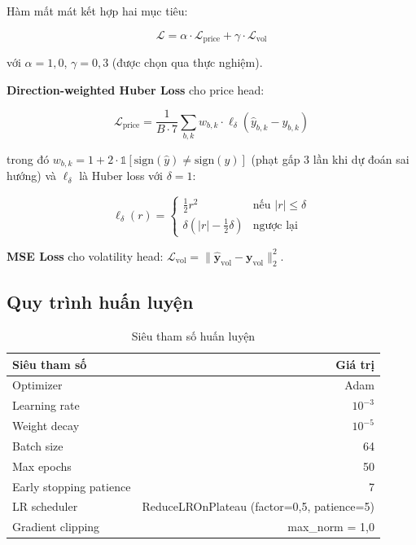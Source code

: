 \documentclass[12pt, a4paper]{report}
\begin{document}
Hàm mất mát kết hợp hai mục tiêu:

\begin{equation}
  \mathcal{L} = \alpha \cdot \mathcal{L}_{\text{price}} + \gamma \cdot \mathcal{L}_{\text{vol}}
\end{equation}

với $\alpha = 1{,}0$, $\gamma = 0{,}3$ (được chọn qua thực nghiệm).

\textbf{Direction-weighted Huber Loss} cho price head:

\begin{equation}
  \mathcal{L}_{\text{price}} = \frac{1}{B \cdot 7} \sum_{b,k}
  w_{b,k} \cdot \ell_\delta(\hat{y}_{b,k} - y_{b,k})
\end{equation}

trong đó $w_{b,k} = 1 + 2 \cdot \mathbb{1}[\text{sign}(\hat{y}) \neq \text{sign}(y)]$
(phạt gấp 3 lần khi dự đoán sai hướng) và $\ell_\delta$ là Huber loss với $\delta = 1$:

\begin{equation}
  \ell_\delta(r) = \begin{cases}
    \frac{1}{2}r^2 & \text{nếu } |r| \leq \delta \\
    \delta(|r| - \frac{1}{2}\delta) & \text{ngược lại}
  \end{cases}
\end{equation}

\textbf{MSE Loss} cho volatility head: $\mathcal{L}_{\text{vol}} = \|\hat{\mathbf{y}}_{\text{vol}} - \mathbf{y}_{\text{vol}}\|_2^2$.

\subsection{Quy trình huấn luyện}

\begin{table}[H]
  \centering
  \caption{Siêu tham số huấn luyện}
  \label{tab:hyperparams}
  \begin{tabular}{lr}
    \toprule
    Siêu tham số & Giá trị \\
    \midrule
    Optimizer & Adam \\
    Learning rate & $10^{-3}$ \\
    Weight decay & $10^{-5}$ \\
    Batch size & 64 \\
    Max epochs & 50 \\
    Early stopping patience & 7 \\
    LR scheduler & ReduceLROnPlateau (factor=0,5, patience=5) \\
    Gradient clipping & max\_norm = 1,0 \\
    \bottomrule
  \end{tabular}
\end{table}
\end{document}
